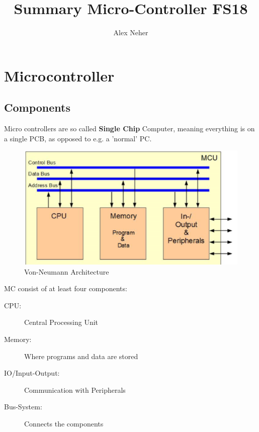 \documentclass[a4paper, 11pt, nofootinbib]{article}
\begin{document}
\title{Summary Micro-Controller FS18}
\author{Alex Neher}
\maketitle

\tableofcontents
\newpage
\listoffigures
\newpage

\graphicspath{{./Pictures/}}

\section{Microcontroller}
\subsection{Components}
Micro controllers are so called \textbf{Single Chip} Computer, meaning everything is on a single PCB, as opposed to e.g. a 'normal' PC.

\begin{figure}
	\centering
	\includegraphics[keepaspectratio=true,height=10\baselineskip]{architecture.PNG}
	\caption{Von-Neumann Architecture}
	\label{fig:arch}
\end{figure}

MC consist of at least four components:

\begin{description}
	\item[CPU: ] Central Processing Unit
	\item[Memory: ] Where programs and data are stored
	\item[IO/Input-Output: ] Communication with Peripherals
	\item[Bus-System: ] Connects the components
\end{description}

\vspace{10px}
\end{document}
